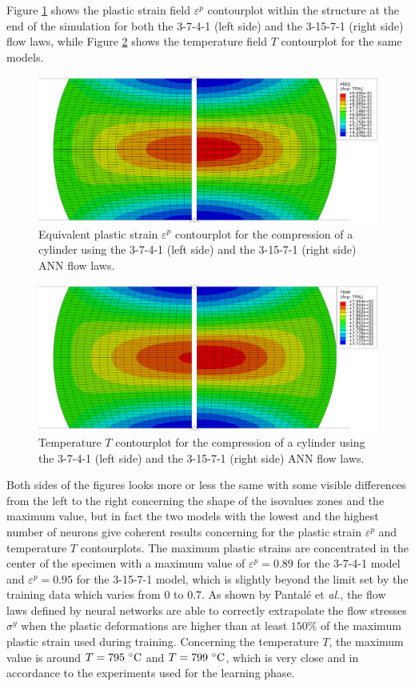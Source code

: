 \documentclass[algorithms,article,submit,pdftex,moreauthors]{Definitions/mdpi}
\makeatletter
\DeclareRobustCommand{\eal}{et \emph{al.}\@\xspace}
\makeatother
\begin{document}
Figure \ref{fig:peeqContourplot} shows the plastic strain field $\varepsilon^p$ contourplot within the structure at the end of the simulation for both the 3-7-4-1 (left side) and the 3-15-7-1 (right side) flow laws, while Figure \ref{fig:dpeeqContourplot} shows the temperature field $T$ contourplot for the same models.
\begin{figure}[!ht]
\centering
\includegraphics[width=0.90\columnwidth]{Figures/peeq}
\caption{Equivalent plastic strain $\varepsilon^p$ contourplot for the compression of a cylinder using the 3-7-4-1 (left side) and the 3-15-7-1 (right side) ANN flow laws.}
\label{fig:peeqContourplot}
\end{figure}
\begin{figure}[!ht]
\centering
\includegraphics[width=0.90\columnwidth]{Figures/temp}
\caption{Temperature $T$ contourplot for the compression of a cylinder using the 3-7-4-1 (left side) and the 3-15-7-1 (right side) ANN flow laws.}
\label{fig:dpeeqContourplot}
\end{figure}
Both sides of the figures looks more or less the same with some visible differences from the left to the right concerning the shape of the isovalues zones and the maximum value, but in fact the two models with the lowest and the highest number of neurons give coherent results concerning for the plastic strain $\varepsilon^p$ and temperature $T$ contourplots.
The maximum plastic strains are concentrated in the center of the specimen with a maximum value of $\varepsilon^p=0.89$ for the 3-7-4-1 model and $\varepsilon^p=0.95$ for the 3-15-7-1 model, which is slightly beyond the limit set by the training data which varies from $0$ to $0.7$.
As shown by Pantalé \eal \cite{Pantale-2021}, the flow laws defined by neural networks are able to correctly extrapolate the flow stresses $\sigma^y$ when the plastic deformations are higher than at least $150\%$ of the maximum plastic strain used during training.
Concerning the temperature $T$, the maximum value is around $T=795~\celsius$ and $T=799~\celsius$, which is very close and in accordance to the experiments used for the learning phase.
\end{document}
